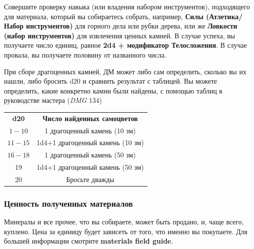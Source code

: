 \documentclass[a4paper, 9pt, twocolumn]{book}
\begin{document}
	Совершите проверку навыка (или владения набором инструментов), подходящего для материала, который вы собираетесь собрать, например, \textbf{Силы (Атлетика/Набор инструментов)} для горного дела или рубки дерева, или же \textbf{Ловкости (набор инструментов)} для извлечения ценных камней. В случае успеха, вы получаете число единиц, равное \textbf{2d4 + модификатор Телосложения}. В случае провала, вы получаете половину от названного числа.
	
	При сборе драгоценных камней, ДМ может либо сам определить, сколько вы их нашли, либо бросить d20 и сравнить результат с таблицей. Вы можете определить, какие конкретно камни были найдены, с помощью таблиц в руководстве мастера (\textit{DMG} 134)
	
	\begin{table}[H]
		
		\centering
		
		\begin{tabularx}{\linewidth}{c C}
			
			\textbf{d20} & \textbf{Число найденных самоцветов} \\
			
			$1-10$ & 1 драгоценный камень (10 зм) \\
			
			$11-15$ & 1d4+1 драгоценный камень (10 зм) \\
			
			$16-18$ & 1 драгоценный камень (50 зм) \\
			
			19 & 1d4+1 драгоценный камень (50 зм) \\
			
			20 & Бросьте дважды \\
			
		\end{tabularx}
	\end{table}
	
	
	
	\subsubsection{Ценность полученных материалов}
	
	Минералы и все прочее, что вы собираете, может быть продано, и, чаще всего, куплено. Цена за единицу будет зависеть от того, что именно вы покупаете. Для большей информации смотрите \textbf{materials field guide}.
	
\end{document}
